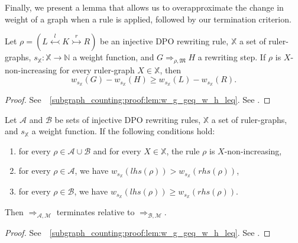 Finally, we present a lemma that allows us to overapproximate the change in weight of a graph when a rule is applied, followed by our termination criterion. 

\begin{lemma}
    \label{subgraph_counting:lem:w_g_geq_w_h_leq}
    Let $\rho \mathop{=} (L \overset{l}{\leftarrowtail} K \overset{r}{\rightarrowtail} R)$ be an injective DPO rewriting rule,
    \( \mathbb{X} \) a set of ruler-graphs,
    \( s_{\mathbb{X}} \mathop{\colon} \mathbb{X} \mathop{\to} \mathbb{N} \) a weight function,
    and \( G \mathop{\Rightarrow}_{\rho,\mathfrak{M}} H \) a rewriting step. 
    If $\rho$ is \( X \)-non-increasing for every ruler-graph \( X \mathop{\in} \mathbb{X} \), then 
    $$
        w_{s_\mathbb{X}}(G) - w_{s_\mathbb{X}}(H) 
        \mathop{\geq} 
        w_{s_\mathbb{X}}(L) - w_{s_\mathbb{X}}(R).
    $$
\end{lemma}
\begin{proof}
    \iflongversion
        See~\textsection~\ref{subgraph_counting:proof:lem:w_g_geq_w_h_leq}.
    \else
        See \cite[Lemma 41]{qiu2025termination}.
    \fi 
\end{proof} 
\begin{theorem}[Termination] 
    \label{subgraph_counting:thm:termination_grs}
    Let \(\mathcal{A}\) and \(\mathcal{B}\) be sets of injective DPO rewriting rules, $\mathbb{X}$ a set of ruler-graphs, and $s_\mathbb{X}$ a weight function. If the following conditions hold:
    \begin{enumerate}
        \item  for every $\rho \mathop{\in} \mathcal{A} \mathop{\cup} \mathcal{B}$ and for every $X \mathop{\in} \mathbb{X}$, the rule $\rho$ is $X$-non-increasing,
        \item for every \(\rho \mathop{\in} \mathcal{A}\), we have \( w_{s_\mathbb{X}}(lhs(\rho)) \mathop{>} w_{s_\mathbb{X}}(rhs(\rho)) \),
        \item for every \(\rho \mathop{\in} \mathcal{B}\), we have \( w_{s_\mathbb{X}}(lhs(\rho)) \mathop{\geq} w_{s_\mathbb{X}}(rhs(\rho)) \).
    \end{enumerate}
    Then \(\mathop{\Rightarrow}_{\mathcal{A},\mathcal{M}}\) terminates relative to \(\mathop{\Rightarrow}_{\mathcal{B},\mathcal{M}}\).
\end{theorem}
\begin{proof}
    \iflongversion
        See~\textsection~\ref{subgraph_counting:proof:lem:w_g_geq_w_h_leq}.
    \else
        See \cite[Lemma 41]{qiu2025termination}.
    \fi 
\end{proof} 